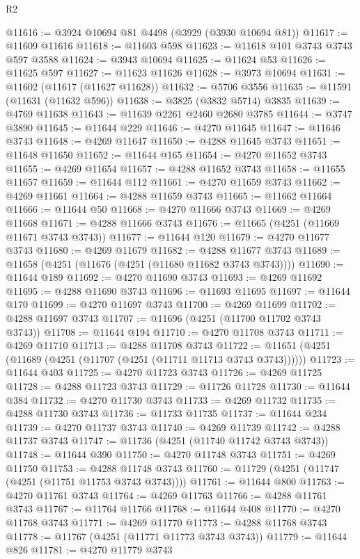 \begin{lexlean}{R2}
\begin{coremodule}
@11616 := @3924 @10694 @81 @4498 (@3929 (@3930 @10694 @81))
@11617 := @11609 @11616
@11618 := @11603 @598
@11623 := @11618 @101 @3743 @3743 @597 @3588
@11624 := @3943 @10694
@11625 := @11624 @53
@11626 := @11625 @597
@11627 := @11623 @11626
@11628 := @3973 @10694
@11631 := @11602 (@11617 (@11627 @11628))
@11632 := @5706 @3556
@11635 := @11591 (@11631 (@11632 @596))
@11638 := @3825 (@3832 @5714) @3835
@11639 := @4769 @11638
@11643 := @11639 @2261 @2460 @2680 @3785
@11644 := @3747 @3890
@11645 := @11644 @229
@11646 := @4270 @11645
@11647 := @11646 @3743
@11648 := @4269 @11647
@11650 := @4288 @11645 @3743
@11651 := @11648 @11650
@11652 := @11644 @165
@11654 := @4270 @11652 @3743
@11655 := @4269 @11654
@11657 := @4288 @11652 @3743
@11658 := @11655 @11657
@11659 := @11644 @112
@11661 := @4270 @11659 @3743
@11662 := @4269 @11661
@11664 := @4288 @11659 @3743
@11665 := @11662 @11664
@11666 := @11644 @50
@11668 := @4270 @11666 @3743
@11669 := @4269 @11668
@11671 := @4288 @11666 @3743
@11676 := @11665 (@4251 (@11669 @11671 @3743 @3743))
@11677 := @11644 @120
@11679 := @4270 @11677 @3743
@11680 := @4269 @11679
@11682 := @4288 @11677 @3743
@11689 := @11658 (@4251 (@11676 (@4251 (@11680 @11682 @3743 @3743))))
@11690 := @11644 @189
@11692 := @4270 @11690 @3743
@11693 := @4269 @11692
@11695 := @4288 @11690 @3743
@11696 := @11693 @11695
@11697 := @11644 @170
@11699 := @4270 @11697 @3743
@11700 := @4269 @11699
@11702 := @4288 @11697 @3743
@11707 := @11696 (@4251 (@11700 @11702 @3743 @3743))
@11708 := @11644 @194
@11710 := @4270 @11708 @3743
@11711 := @4269 @11710
@11713 := @4288 @11708 @3743
@11722 := @11651 (@4251 (@11689 (@4251 (@11707 (@4251 (@11711 @11713 @3743 @3743))))))
@11723 := @11644 @403
@11725 := @4270 @11723 @3743
@11726 := @4269 @11725
@11728 := @4288 @11723 @3743
@11729 := @11726 @11728
@11730 := @11644 @384
@11732 := @4270 @11730 @3743
@11733 := @4269 @11732
@11735 := @4288 @11730 @3743
@11736 := @11733 @11735
@11737 := @11644 @234
@11739 := @4270 @11737 @3743
@11740 := @4269 @11739
@11742 := @4288 @11737 @3743
@11747 := @11736 (@4251 (@11740 @11742 @3743 @3743))
@11748 := @11644 @390
@11750 := @4270 @11748 @3743
@11751 := @4269 @11750
@11753 := @4288 @11748 @3743
@11760 := @11729 (@4251 (@11747 (@4251 (@11751 @11753 @3743 @3743))))
@11761 := @11644 @800
@11763 := @4270 @11761 @3743
@11764 := @4269 @11763
@11766 := @4288 @11761 @3743
@11767 := @11764 @11766
@11768 := @11644 @408
@11770 := @4270 @11768 @3743
@11771 := @4269 @11770
@11773 := @4288 @11768 @3743
@11778 := @11767 (@4251 (@11771 @11773 @3743 @3743))
@11779 := @11644 @826
@11781 := @4270 @11779 @3743

\end{coremodule}
\end{lexlean}
